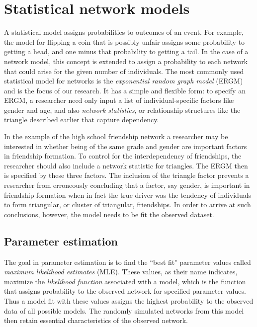 \documentclass[12pt]{article}
\begin{document}
\section{Statistical network models}
A statistical model assigns probabilities to outcomes of an event.  For example, 
the model for flipping a coin that is possibly unfair assigns some 
probability to getting a head, and one minus that probability to getting a tail.  
In the case of a network model, this concept is  
extended to assign a probability to each network that could 
arise for the given number of individuals.
The most commonly used statistical model for networks is the 
\textit{exponential random graph model} (ERGM) 
\citep{Wasserman:1996,Pattison:1999,logit,Snijders:2002,introp*,ergm} and 
is the focus of our research.  It has a simple and flexible form:
to specify an ERGM, a researcher need only input a list of 
individual-specific factors like gender and age, and also \textit{network statistics}, 
or relationship structures like the triangle described earlier that capture
dependency.

In the example of the high school friendship network 
a researcher may be interested in whether being of the same grade and gender
 are important factors in friendship formation.
To control for the interdependency of friendships, the 
researcher should also include a network statistic for triangles.
The ERGM then is specified by these three factors.
The inclusion of the triangle factor
prevents a researcher from erroneously concluding
that a factor, say gender, is important in friendship formation when in 
fact the true driver was the tendency of individuals to form
triangular, or cluster of triangular, friendships.  In order to arrive at 
such conclusions, however, the model needs to be fit the observed dataset.


\subsection{Parameter estimation}
The goal in parameter estimation is to find the ``best fit"
parameter values called \textit{maximum likelihood 
estimates} (MLE).  
These values, as their name indicates, maximize
the \emph{likelihood function} associated with a model, which is the function 
that assigns probability to the observed network for specified parameter values.
Thus a model fit with these values assigns the highest probability to the observed data of 
all possible models.  The randomly simulated networks from this model 
then retain essential characteristics of the observed network.
\end{document}
